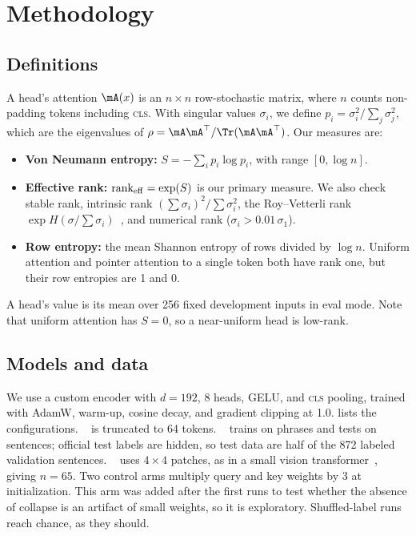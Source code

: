 \section{Methodology}
\label{sec:method}

\subsection{Definitions}

A head's attention $\mA(x)$ is an $n\times n$ row-stochastic matrix, where $n$ counts non-padding tokens including \textsc{cls}. With singular values $\sigma_i$, we define $p_i=\sigma_i^2/\sum_j\sigma_j^2$, which are the eigenvalues of $\rho=\mA\mA^\top/\Tr(\mA\mA^\top)$. Our measures are:
\begin{itemize}[leftmargin=*,itemsep=0pt,topsep=0pt]
    \item {\bf Von Neumann entropy:} $S=-\sum_i p_i\log p_i$, with range $[0,\log n]$.
    \item {\bf Effective rank:} $\mathrm{rank}_{\mathrm{eff}}=\exp(S)$ is our primary measure. We also check stable rank, intrinsic rank $(\sum\sigma_i)^2/\sum\sigma_i^2$, the Roy--Vetterli rank $\exp H(\sigma/\sum\sigma_i)$~\citep{roy2007effective}, and numerical rank ($\sigma_i>0.01\,\sigma_1$).
    \item {\bf Row entropy:} the mean Shannon entropy of rows divided by $\log n$. Uniform attention and pointer attention to a single token both have rank one, but their row entropies are 1 and 0.
\end{itemize}
A head's value is its mean over 256 fixed development inputs in eval mode. Note that uniform attention has $S=0$, so a near-uniform head is low-rank.

\subsection{Models and data}

We use a custom encoder with $d=192$, 8 heads, GELU, and \textsc{cls} pooling, trained with AdamW, warm-up, cosine decay, and gradient clipping at 1.0.  lists the configurations. \agnews~\citep{zhang2015character} is truncated to 64 tokens. \sst~\citep{socher2013recursive} trains on phrases and tests on sentences; official test labels are hidden, so test data are half of the 872 labeled validation sentences. \cifar~\citep{krizhevsky2009learning} uses $4\times4$ patches, as in a small vision transformer~\citep{dosovitskiy2021image}, giving $n=65$. Two control arms multiply query and key weights by 3 at initialization. This arm was added after the first runs to test whether the absence of collapse is an artifact of small weights, so it is exploratory. Shuffled-label runs reach chance, as they should.

